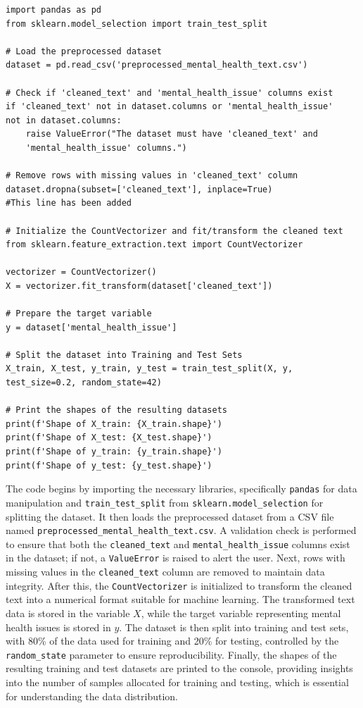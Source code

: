 \begin{verbatim}
import pandas as pd
from sklearn.model_selection import train_test_split

# Load the preprocessed dataset
dataset = pd.read_csv('preprocessed_mental_health_text.csv')

# Check if 'cleaned_text' and 'mental_health_issue' columns exist
if 'cleaned_text' not in dataset.columns or 'mental_health_issue' 
not in dataset.columns:
    raise ValueError("The dataset must have 'cleaned_text' and 
    'mental_health_issue' columns.")

# Remove rows with missing values in 'cleaned_text' column
dataset.dropna(subset=['cleaned_text'], inplace=True) 
#This line has been added

# Initialize the CountVectorizer and fit/transform the cleaned text
from sklearn.feature_extraction.text import CountVectorizer

vectorizer = CountVectorizer()
X = vectorizer.fit_transform(dataset['cleaned_text'])

# Prepare the target variable
y = dataset['mental_health_issue']

# Split the dataset into Training and Test Sets
X_train, X_test, y_train, y_test = train_test_split(X, y, 
test_size=0.2, random_state=42)

# Print the shapes of the resulting datasets
print(f'Shape of X_train: {X_train.shape}')
print(f'Shape of X_test: {X_test.shape}')
print(f'Shape of y_train: {y_train.shape}')
print(f'Shape of y_test: {y_test.shape}')
\end{verbatim}

\noindent
The code begins by importing the necessary libraries, specifically \texttt{pandas} for data manipulation and \texttt{train\_test\_split} from \texttt{sklearn.model\_selection} for splitting the dataset. It then loads 
the preprocessed dataset from a CSV file named \newline
\texttt{preprocessed\_mental\_health\_text.csv}. A validation check is performed to ensure that both the \texttt{cleaned\_text} and 
\texttt{mental\_health\_issue} columns exist in the dataset; if not, a \texttt{ValueError} is raised to alert the user. Next, rows with missing values in the \texttt{cleaned\_text} column are removed to maintain data integrity. After this, the \texttt{CountVectorizer} is initialized to transform the cleaned text into a numerical format suitable for machine learning. The transformed text data is stored in the variable \(X\), while the target variable representing mental health issues is stored in \(y\). The dataset is then split into training and test sets, with 80\% of the data used for training and 20\% for testing, controlled by the \texttt{random\_state} parameter to ensure reproducibility. Finally, the shapes of the resulting training and test datasets are printed to the console, providing insights into the number of samples allocated for training and testing, which is essential for understanding the data distribution.


